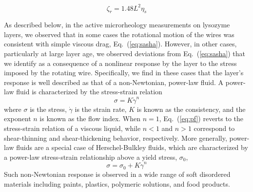 \begin{equation}
  \zeta_r = 1.48 L^2\eta_s
  \label{eq:wire_zeta}
\end{equation}
 
 As described below, in the active microrheology measurements on lysozyme layers, we observed that in some cases the rotational motion of the wires was consistent with simple viscous drag, Eq.~(\ref{eq:sasha}). However, in other cases, particularly at large layer age, we observed deviations from Eq.~(\ref{eq:sasha}) that we identify as a consequence of a nonlinear response by the layer to the stress imposed by the rotating wire.  Specifically, we find in these cases that the layer's response is well described as that of a non-Newtonian, power-law fluid. A power-law fluid is characterized by the stress-strain relation
\begin{equation}
\sigma = K\dot{\gamma}^{n}
\label{eq:pf}
\end{equation}
\noindent where $\sigma$ is the stress, $\dot{\gamma}$ is the strain rate, $K$ is known as the consistency, and the exponent $n$ is known as the flow index.  When $n=1$, Eq.~(\ref{eq:pf}) reverts to the stress-strain relation of a viscous liquid, while $n < 1$ and $n > 1$ correspond to shear-thinning and shear-thickening behavior, respectively. More generally, power-law fluids are a special case of Herschel-Bulkley fluids, which are characterized by a power-law stress-strain relationship above a yield stress, $\sigma_0$,
\begin{equation}
\sigma = \sigma_0 + K\dot{\gamma}^n
\label{eq:HB}
\end{equation}
\noindent Such non-Newtonian response is observed in a wide range of soft disordered materials including paints, plastics, polymeric solutions, and food products.~\cite{Alexandrou2001a}

